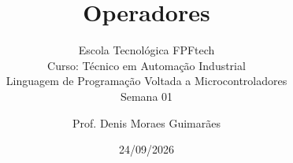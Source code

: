 \title{Operadores}
\subtitle{\texorpdfstring{Escola Tecnológica FPFtech\\[0.2cm]
Curso: Técnico em Automação Industrial\\[0.2cm]
\small Linguagem de Programação Voltada a Microcontroladores\\[0.15cm]
Semana 01}{FPFtech — Técnico em Automação Industrial — Semana 01}}
\author{Prof. Denis Moraes Guimarães}
\date{24/09/2026}
